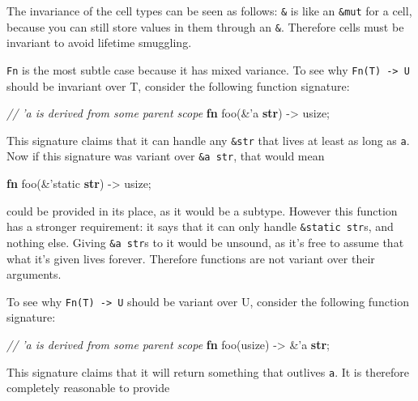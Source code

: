 \documentclass[a4paper,]{book}
\newenvironment{Shaded}{\begin{snugshade}}{\end{snugshade}}
\newcommand{\KeywordTok}[1]{\textcolor[rgb]{0.13,0.29,0.53}{\textbf{{#1}}}}
\newcommand{\CommentTok}[1]{\textcolor[rgb]{0.56,0.35,0.01}{\textit{{#1}}}}
\newcommand{\OtherTok}[1]{\textcolor[rgb]{0.56,0.35,0.01}{{#1}}}
\newcommand{\NormalTok}[1]{{#1}}
\begin{document}
The invariance of the cell types can be seen as follows: \texttt{\&} is
like an \texttt{\&mut} for a cell, because you can still store values in
them through an \texttt{\&}. Therefore cells must be invariant to avoid
lifetime smuggling.

\texttt{Fn} is the most subtle case because it has mixed variance. To
see why \texttt{Fn(T)\ -\textgreater{}\ U} should be invariant over T,
consider the following function signature:

\begin{Shaded}
\begin{Highlighting}[]
\CommentTok{// 'a is derived from some parent scope}
\KeywordTok{fn} \NormalTok{foo(&}\OtherTok{'a} \KeywordTok{str}\NormalTok{) -> usize;}
\end{Highlighting}
\end{Shaded}

This signature claims that it can handle any \texttt{\&str} that lives
at least as long as \texttt{\textquotesingle{}a}. Now if this signature
was variant over \texttt{\&\textquotesingle{}a\ str}, that would mean

\begin{Shaded}
\begin{Highlighting}[]
\KeywordTok{fn} \NormalTok{foo(&}\OtherTok{'static} \KeywordTok{str}\NormalTok{) -> usize;}
\end{Highlighting}
\end{Shaded}

could be provided in its place, as it would be a subtype. However this
function has a stronger requirement: it says that it can only handle
\texttt{\&\textquotesingle{}static\ str}s, and nothing else. Giving
\texttt{\&\textquotesingle{}a\ str}s to it would be unsound, as it's
free to assume that what it's given lives forever. Therefore functions
are not variant over their arguments.

To see why \texttt{Fn(T)\ -\textgreater{}\ U} should be variant over U,
consider the following function signature:

\begin{Shaded}
\begin{Highlighting}[]
\CommentTok{// 'a is derived from some parent scope}
\KeywordTok{fn} \NormalTok{foo(usize) -> &}\OtherTok{'a} \KeywordTok{str}\NormalTok{;}
\end{Highlighting}
\end{Shaded}

This signature claims that it will return something that outlives
\texttt{\textquotesingle{}a}. It is therefore completely reasonable to
provide
\end{document}
